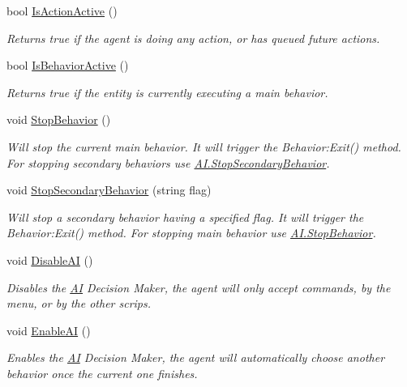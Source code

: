 \begin{DoxyCompactItemize}
bool \mbox{\hyperlink{class_lua_1_1_a_i_aa05b26304b734cfe6f5a220bb54d9bc7}{Is\+Action\+Active}} ()
\begin{DoxyCompactList}\small\item\em Returns true if the agent is doing any action, or has queued future actions. \end{DoxyCompactList}\item 
bool \mbox{\hyperlink{class_lua_1_1_a_i_a2d682616c9d7a8fd7ea045906a716e02}{Is\+Behavior\+Active}} ()
\begin{DoxyCompactList}\small\item\em Returns true if the entity is currently executing a main behavior. \end{DoxyCompactList}\item 
void \mbox{\hyperlink{class_lua_1_1_a_i_aa30ed6fc0195cd828d3f5971b80ae053}{Stop\+Behavior}} ()
\begin{DoxyCompactList}\small\item\em Will stop the current main behavior. It will trigger the Behavior\+:Exit() method. For stopping secondary behaviors use \mbox{\hyperlink{class_lua_1_1_a_i_a8c9a883b10e07fe120ff68d75391fe2b}{A\+I.\+Stop\+Secondary\+Behavior}}. \end{DoxyCompactList}\item 
void \mbox{\hyperlink{class_lua_1_1_a_i_a8c9a883b10e07fe120ff68d75391fe2b}{Stop\+Secondary\+Behavior}} (string flag)
\begin{DoxyCompactList}\small\item\em Will stop a secondary behavior having a specified flag. It will trigger the Behavior\+:Exit() method. For stopping main behavior use \mbox{\hyperlink{class_lua_1_1_a_i_aa30ed6fc0195cd828d3f5971b80ae053}{A\+I.\+Stop\+Behavior}}. \end{DoxyCompactList}\item 
void \mbox{\hyperlink{class_lua_1_1_a_i_af829734ccdb97c9440ebabba2868ee05}{Disable\+AI}} ()
\begin{DoxyCompactList}\small\item\em Disables the \mbox{\hyperlink{class_lua_1_1_a_i}{AI}} Decision Maker, the agent will only accept commands, by the menu, or by the other scrips. \end{DoxyCompactList}\item 
void \mbox{\hyperlink{class_lua_1_1_a_i_abdd5b0d3983359ec46851cd99bdd2cb2}{Enable\+AI}} ()
\begin{DoxyCompactList}\small\item\em Enables the \mbox{\hyperlink{class_lua_1_1_a_i}{AI}} Decision Maker, the agent will automatically choose another behavior once the current one finishes. \end{DoxyCompactList}\item 

\end{DoxyCompactItemize}
